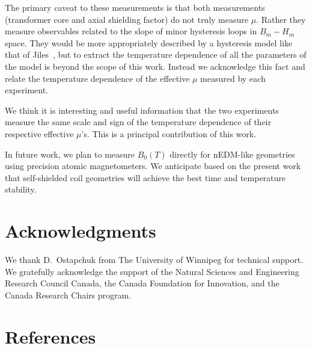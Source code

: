 \documentclass[review]{elsarticle}
\begin{document}
The primary caveat to these measurements is that both measurements
(transformer core and axial shielding factor) do not truly measure
$\mu$.  Rather they measure observables related to the slope of minor
hysteresis loops in $B_m-H_m$ space.  They would be more appropriately
described by a hysteresis model like that of Jiles~\cite{bib:jiles},
but to extract the temperature dependence of all the parameters of the
model is beyond the scope of this work.  Instead we acknowledge this
fact and relate the temperature dependence of the effective $\mu$
measured by each experiment.

We think it is interesting and useful information that the two
experiments measure the same scale and sign of the temperature
dependence of their respective effective $\mu$'s.  This is a principal
contribution of this work.

In future work, we plan to measure $B_0(T)$ directly for nEDM-like
geometries using precision atomic magnetometers.  We anticipate based
on the present work that self-shielded coil geometries will achieve
the best time and temperature stability.



\section{Acknowledgments}

We thank D.~Ostapchuk from The University of Winnipeg for technical
support.  We gratefully acknowledge the support of the Natural
Sciences and Engineering Research Council Canada, the Canada
Foundation for Innovation, and the Canada Research Chairs program.


\section*{References}
\end{document}
